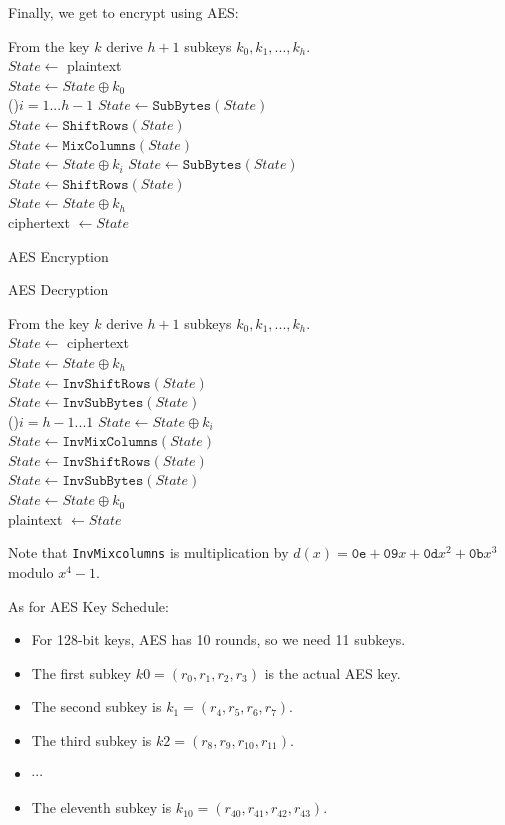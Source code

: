 \documentclass[12pt,titlepage]{article}
\begin{document}
Finally, we get to encrypt using AES: 
\begin{algorithm}
	From the key $k$ derive $h + 1$ subkeys $k_0 , k_1 , ..., k_h$.\\
	$State \leftarrow $ plaintext\\
	$State \leftarrow State \oplus k_0$\\
	\For(){$i = 1...h-1$}{
		$State \leftarrow \texttt{SubBytes}(State)$ \\
		$State \leftarrow \texttt{ShiftRows}(State)$ \\
		$State \leftarrow \texttt{MixColumns}(State)$ \\
		$State \leftarrow State \oplus k_i$
	} 
	$State \leftarrow \texttt{SubBytes}(State)$ \\
	$State \leftarrow \texttt{ShiftRows}(State)$ \\
	$State \leftarrow State \oplus k_h$\\
	ciphertext $\leftarrow State$
	\caption{AES Encryption}
\end{algorithm}

\begin{algorithm}
	\caption{AES Decryption}
	From the key $k$ derive $h + 1$ subkeys $k_0 , k_1 , ..., k_h$.\\
	$State \leftarrow $ ciphertext\\
	$State \leftarrow State \oplus k_h$\\
	$State \leftarrow \texttt{InvShiftRows}(State)$ \\
	$State \leftarrow \texttt{InvSubBytes}(State)$ \\
	\For(){$i = h-1...1$}{
		$State \leftarrow State \oplus k_i$\\
		$State \leftarrow \texttt{InvMixColumns}(State)$ \\
		$State \leftarrow \texttt{InvShiftRows}(State)$ \\
		$State \leftarrow \texttt{InvSubBytes}(State)$ \\
	} 
	$State \leftarrow State \oplus k_0$\\
	plaintext $\leftarrow State$
\end{algorithm}

Note that \texttt{InvMixcolumns} is multiplication by $d(x) = \texttt{0e} + \texttt{09}x + \texttt{0d}x^2 + \texttt{0b}x^3$ modulo $x^4 - 1$.

As for AES Key Schedule: \begin{itemize}
\item For 128-bit keys, AES has 10 rounds, so we need 11 subkeys.
\item The first subkey $k 0 = (r_0 , r_1 , r_2 , r_3)$ is the actual AES key.
\item The second subkey is $k_1 = (r_4 , r_5 , r_6 , r_7 )$.
\item The third subkey is $k 2 = (r_8 , r_9 , r_{10} , r_{11})$.
\item $\cdots$
\item The eleventh subkey is $k_{10} = (r_{40} , r_{41} , r_{42} , r_{43} )$.
\end{itemize}
\end{document}
